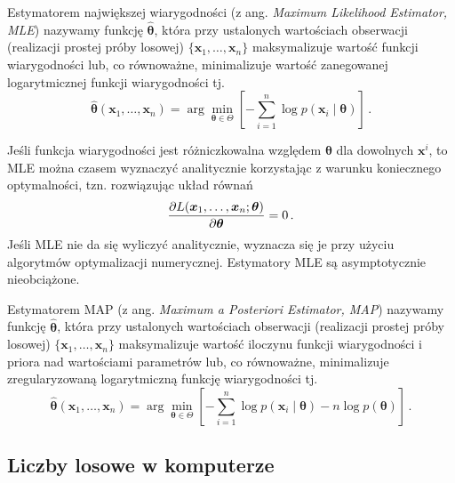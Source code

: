 \documentclass{myclass}
\numberwithin{equation}{subsection}
\begin{document}
\begin{definition}
Estymatorem największej wiarygodności (z ang. \textit{Maximum Likelihood Estimator, MLE}) nazywamy
funkcję \(\bm{\hat{\theta}}\), która przy ustalonych wartościach obserwacji (realizacji prostej
próby losowej) \(\{\bm{x}_1,\ldots,\bm{x}_n\}\) maksymalizuje wartość funkcji wiarygodności lub, co
równoważne, minimalizuje wartość zanegowanej logarytmicznej funkcji wiarygodności tj.
\[
\bm{\hat \theta}(\bm{x}_1,\ldots,\bm{x}_n) = \arg \min_{\bm{\theta} \in \Theta} \left[- \sum_{i=1}^n \log p(\bm{x}_i \mid \bm{\theta})\right]\,.
\]
\end{definition}
    
Jeśli funkcja wiarygodności jest różniczkowalna względem \(\bm{\theta}\) dla dowolnych \(\bm{x}^i\),
to MLE można czasem wyznaczyć analitycznie korzystając z warunku koniecznego optymalności, tzn.
rozwiązując układ równań
\[
\pdv{L(\bm{x}_1,\ldots,\bm{x}_n; \bm{\theta})}{\bm{\theta}} = 0\,.
\]
Jeśli MLE nie da się wyliczyć analitycznie, wyznacza się je przy użyciu algorytmów optymalizacji
numerycznej. Estymatory MLE są asymptotycznie nieobciążone.

\begin{definition}
Estymatorem MAP (z ang. \textit{Maximum a Posteriori Estimator, MAP}) nazywamy funkcję
\(\bm{\hat\theta}\), która przy ustalonych wartościach obserwacji (realizacji prostej próby losowej)
\(\{\bm{x}_1,\ldots,\bm{x}_n\}\) maksymalizuje wartość iloczynu funkcji wiarygodności i priora nad
wartościami parametrów lub, co równoważne, minimalizuje zregularyzowaną logarytmiczną funkcję
wiarygodności tj.
\[
\bm{\hat\theta}(\bm{x}_1,\ldots,\bm{x}_n) = \arg \min_{\bm{\theta} \in \Theta} \left[ - \sum_{i=1}^n \log p(\bm{x}_i \mid \bm{\theta}) - n \log p(\bm{\theta}) \right]\,.
\]
\end{definition}


\subsection{Liczby losowe w komputerze}
\end{document}
